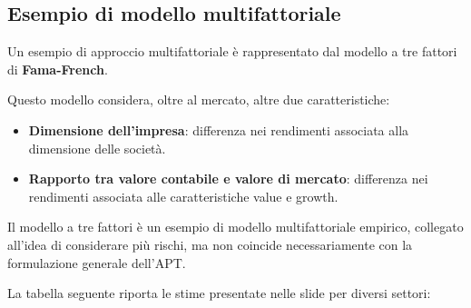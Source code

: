 \subsection{Esempio di modello multifattoriale}

\noindent Un esempio di approccio multifattoriale
è rappresentato dal modello a tre fattori
di \textbf{Fama-French}.

\medskip

\noindent Questo modello considera,
oltre al mercato, altre due caratteristiche:

\begin{itemize}
    \item \textbf{Dimensione dell'impresa}:
    differenza nei rendimenti associata
    alla dimensione delle società.

    \item \textbf{Rapporto tra valore contabile
    e valore di mercato}: differenza
    nei rendimenti associata alle
    caratteristiche value e growth.
\end{itemize}

\noindent Il modello a tre fattori è un esempio
di modello multifattoriale empirico,
collegato all'idea di considerare più rischi,
ma non coincide necessariamente
con la formulazione generale dell'APT.

\medskip

\noindent La tabella seguente riporta le stime
presentate nelle slide per diversi settori:

\begin{center}
\end{center}


